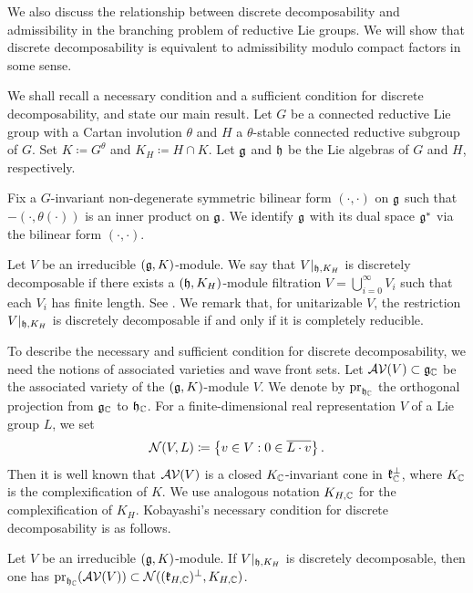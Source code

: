 We also discuss the relationship between discrete decomposability and admissibility in the branching problem of reductive Lie groups.
We will show that discrete decomposability is equivalent to admissibility modulo compact factors in some sense.

We shall recall a necessary condition and a sufficient condition for discrete decomposability, and state our main result.
Let $G$ be a connected reductive Lie group with a Cartan involution $\theta$ and $H$ a $\theta$-stable connected reductive subgroup of $G$.
Set $K\coloneq G^\theta$ and $K_H\coloneq H\cap K$.
Let $\mathfrak{g}$ and $\mathfrak{h}$ be the Lie algebras of $G$ and $H$, respectively.

Fix a $G$-invariant non-degenerate symmetric bilinear form $(\cdot, \cdot)$ on $\mathfrak{g}$ such that $-(\cdot, \theta(\cdot))$ is an inner product on $\mathfrak{g}$.
We identify $\mathfrak{g}$ with its dual space $\mathfrak{g}^*$ via the bilinear form $(\cdot, \cdot)$.

Let $V$ be an irreducible $(\mathfrak{g}, K)$-module.
We say that $V|_{\mathfrak{h}, K_H}$ is discretely decomposable if there exists a $(\mathfrak{h}, K_H)$-module filtration $V = \bigcup_{i=0}^\infty V_i$ such that each $V_i$ has finite length.
See \cite[Definition 1.1]{Ko98_discrete_decomposable_3}.
We remark that, for unitarizable $V$, the restriction $V|_{\mathfrak{h}, K_H}$ is discretely decomposable if and only if it is completely reducible.

To describe the necessary and sufficient condition for discrete decomposability, we need the notions of associated varieties and wave front sets.
Let $\mathcal{AV}(V) \subset \mathfrak{g}_{\mathbb{C}}$ be the associated variety of the $(\mathfrak{g}, K)$-module $V$.
We denote by $\mathrm{pr}_{\mathfrak{h}_{\mathbb{C}}}$ the orthogonal projection from $\mathfrak{g}_{\mathbb{C}}$ to $\mathfrak{h}_{\mathbb{C}}$.
For a finite-dimensional real representation $V$ of a Lie group $L$, we set
\begin{align*}
	\mathcal{N}(V, L) \coloneq \left\{v \in V : 0 \in \overline{L\cdot v} \right\}.
\end{align*}
Then it is well known that $\mathcal{AV}(V)$ is a closed $K_{\mathbb{C}}$-invariant cone in $\mathfrak{k}_{\mathbb{C}}^\perp$, where $K_{\mathbb{C}}$ is the complexification of $K$.
We use analogous notation $K_{H, \mathbb{C}}$ for the complexification of $K_H$.
Kobayashi's necessary condition \cite[Corollary 3.4]{Ko98_discrete_decomposable_3} for discrete decomposability is as follows.

\begin{fact} \label{fact:IntroKobayashiNecessaryCondition}
	Let $V$ be an irreducible $(\mathfrak{g}, K)$-module.
	If $V|_{\mathfrak{h}, K_H}$ is discretely decomposable, then one has $\mathrm{pr}_{\mathfrak{h}_{\mathbb{C}}}(\mathcal{AV}(V)) \subset \mathcal{N}((\mathfrak{k}_{H, \mathbb{C}})^\perp, K_{H, \mathbb{C}})$.
\end{fact}

